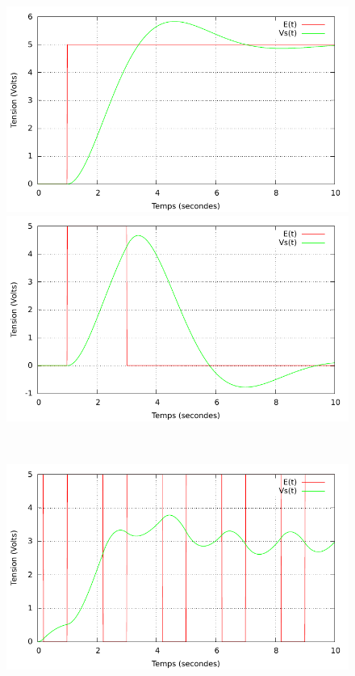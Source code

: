\documentclass[a4paper,11pt]{article}
\begin{document}
  \begin{figure}[h!]
   \begin{minipage}[b]{0.5\linewidth}
      \centering \includegraphics[scale=0.68]{CCechelon.pdf}
   \end{minipage}\hfill
   \begin{minipage}[b]{0.5\linewidth}   
      \centering \includegraphics[scale=.68]{CCporte.pdf}
   \end{minipage}\\
    \begin{minipage}[b]{0.5\linewidth}   
      \centering \includegraphics[scale=.68]{CCcarre.pdf}

\end{minipage}
\end{figure}
\end{document}
